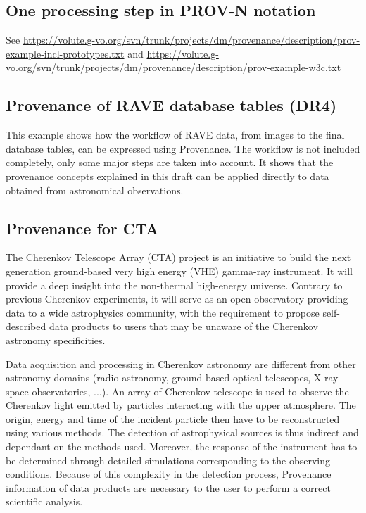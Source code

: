 \subsection{One processing step in PROV-N notation}

See \url{https://volute.g-vo.org/svn/trunk/projects/dm/provenance/description/prov-example-incl-prototypes.txt}
and \url{https://volute.g-vo.org/svn/trunk/projects/dm/provenance/description/prov-example-w3c.txt}


\subsection{Provenance of RAVE database tables (DR4)}

This example shows how the workflow of RAVE data, from images to the final database tables, can be expressed using Provenance. 
The workflow is not included completely, only some major steps are taken into account. It shows that the provenance concepts explained in this draft can be applied directly to data obtained from astronomical observations.


\subsection{Provenance for CTA}

The Cherenkov Telescope Array (CTA) project is an initiative to build the next generation ground-based very high energy (VHE) gamma-ray instrument. It will provide a deep insight into the non-thermal high-energy universe. Contrary to previous Cherenkov experiments, it will serve as an open observatory providing data to a wide astrophysics community, with the requirement to propose self-described data products to users that may be unaware of the Cherenkov astronomy specificities.

Data acquisition and processing in Cherenkov astronomy are different from other astronomy domains (radio astronomy, ground-based optical telescopes, X-ray space observatories, ...). An array of Cherenkov telescope is used to observe the Cherenkov light emitted by particles interacting with the upper atmosphere. The origin, energy and time of the incident particle then have to be reconstructed using various methods. The detection of astrophysical sources is thus indirect and dependant on the methods used. Moreover, the response of the instrument has to be determined through detailed simulations corresponding to the observing conditions. Because of this complexity in the detection process, Provenance information of data products are necessary to the user to  perform a correct scientific analysis.

